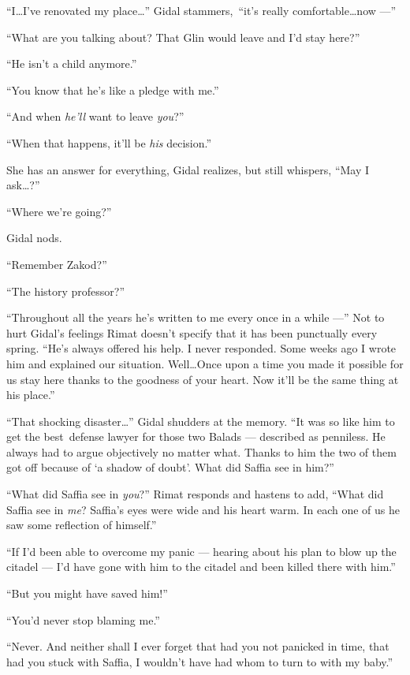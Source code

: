 \documentclass[twoside,11pt,openany]{book}
\begin{document}
``I{\ldots}I've renovated my place{\ldots}'' Gidal stammers,~``it's really
comfortable{\ldots}now ---''

``What are you talking about?  That Glin would leave and I'd stay here?''

``He isn't a child anymore.''

``You know that he's like a pledge{ }with me.''

``And when\textit{ he'll} want to leave \textit{you}?''

``When that happens, it'll be \textit{his} decision.''

She has an answer for everything, Gidal realizes, but still whispers, ``May I ask{\ldots}?''

``Where we're going?''

Gidal nods.

``Remember Zakod?''

``The history professor?''

``Throughout all the years he's written to me every once in a while ---'' Not to hurt Gidal's
feelings Rimat doesn't specify that it has been{ }{punctually}{ }every
spring. ``He's always offered his help. I never responded. Some weeks ago I wrote him and explained our
situation. Well{\ldots}Once upon a time you made it possible for us stay here thanks to{ }the goodness
of your heart. Now it'll be the same thing at his place.''

``That shocking disaster{\ldots}'' Gidal  shudders at
the memory. ``It was so like him to get the best~defense lawyer for those two Balads ---
described as penniless. He always had to argue objectively no matter what. Thanks to him the two of them got off
because of `a shadow of doubt'. What did Saffia see in him?''

``What did Saffia see in \textit{you}?'' Rimat responds and hastens to add,
``What did Saffia see in \textit{me}? Saffia's eyes were wide and his heart warm. In each one of us he saw
some reflection of himself.''

``If I'd been able to overcome my panic --- hearing about his plan to blow up the citadel --- I'd have gone
with him to the citadel and been killed there with him.''

``But you might have saved him!''

``You'd never stop blaming me.''

``Never. And neither shall I ever forget that had you not panicked in time, that had you stuck with
Saffia, I wouldn't have had whom to turn to with my baby.''
\end{document}
